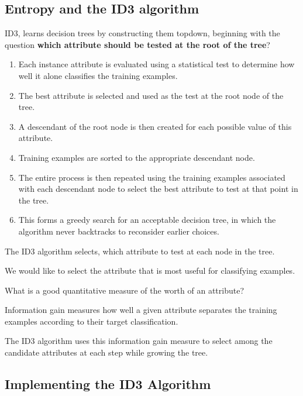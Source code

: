 \documentclass[%
oneside,                 %
final,                   %
10pt]{article}
\begin{document}
\subsection*{Entropy and the ID3 algorithm}

ID3, learns decision trees by constructing
them topdown, beginning with the question \textbf{which attribute should be tested at the root of the tree}?

\begin{enumerate}
\item Each instance attribute is evaluated using a statistical test to determine how well it alone classifies the training examples.

\item The best attribute is selected and used as the test at the root node of the tree.

\item A descendant of the root node is then created for each possible value of this attribute.

\item Training examples are sorted to the appropriate descendant node.

\item The entire process is then repeated using the training examples associated with each descendant node to select the best attribute to test at that point in the tree.

\item This forms a greedy search for an acceptable decision tree, in which the algorithm never backtracks to reconsider earlier choices. 
\end{enumerate}

\noindent
The ID3 algorithm selects, which attribute to test at each node in the
tree.

We would like to select the attribute that is most useful for classifying
examples.

What is a good quantitative measure of the worth of an attribute?

Information gain measures how well a given attribute separates the
training examples according to their target classification.

The ID3 algorithm uses this information gain measure to select among the candidate
attributes at each step while growing the tree.

\subsection*{Implementing the ID3 Algorithm}
\end{document}
